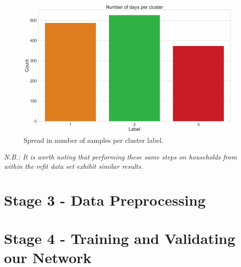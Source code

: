 \begin{adjustwidth}{-1.65cm}{-0.0cm}
\begin{enumerate}[label=Step 2.\arabic*:, leftmargin=*]
        \begin{figure}[hbt!]
            \centering
            \includegraphics[width=\textwidth]{Images/Chapter 6/UCID/UCID-HDBSCAN-V4.pdf}
            \caption{Spread in number of samples per cluster label.}
            \label{fig:UCID-HDBSCAN-V4}
        \end{figure}
        
        \noindent \newline \textit{N.B.: It is worth noting that performing these same steps on households from within the \gls{refit} data set exhibit similar results.}
    \end{enumerate}
\end{adjustwidth}

\section{Stage 3 - Data Preprocessing}
\label{sec:Methodology:Stage-3}

\section{Stage 4 - Training and Validating our Network}
\label{sec:Methodology:Stage-4}